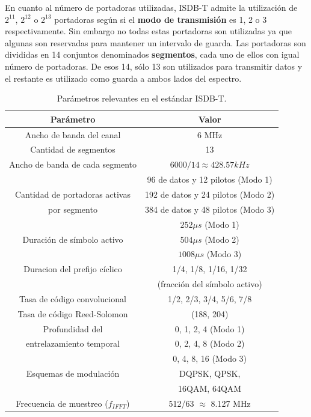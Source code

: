 \documentclass[journal,comsoc]{IEEEtran}
\begin{document}
En cuanto al número de portadoras utilizadas, ISDB-T admite la utilización de $2^{11}$, $2^{12}$ o $2^{13}$ portadoras según si el \textbf{modo de transmisión} es 1, 2 o 3 respectivamente. Sin embargo no todas estas portadoras son utilizadas ya que algunas son reservadas para mantener un intervalo de guarda. Las portadoras son divididas en 14 conjuntos denominados \textbf{segmentos}, cada uno de ellos con igual número de portadoras. De esos 14, sólo 13 son utilizados para transmitir datos y el restante es utilizado como guarda a ambos lados del espectro.
\begin{table}[h!]
\centering
\begin{tabular}{|c|c|}
\hline
\textbf{Parámetro} 				& \textbf{Valor}\\
\hline
Ancho de banda del canal 		& 6 MHz\\
\hline
Cantidad de segmentos 			& 13 \\
\hline
Ancho de banda de cada segmento & $6000/14 \approx 428.57kHz$ \\
\hline
  											& 96 de datos y 12 pilotos (Modo 1) \\
Cantidad de portadoras activas  & 192 de datos y 24 pilotos (Modo 2) \\
 		por segmento									& 384 de datos y 48 pilotos (Modo 3)\\
\hline
 								& $252 \mu s$ (Modo 1)\\
Duración de símbolo activo 		& $504 \mu s$ (Modo 2) \\
								& $1008 \mu s$ (Modo 3) \\
\hline
Duracion del prefijo cíclico 	& 1/4, 1/8, 1/16, 1/32 \\
 								& (fracción del símbolo activo)\\
\hline
Tasa de código convolucional 	& 1/2, 2/3, 3/4, 5/6, 7/8\\
\hline
Tasa de código Reed-Solomon 	& (188, 204) \\
\hline
 	Profundidad del			& 0, 1, 2, 4 (Modo 1) \\
entrelazamiento temporal & 0, 2, 4, 8 (Modo 2) \\
		 & 0, 4, 8, 16 (Modo 3)\\
\hline
Esquemas de modulación & DQPSK, QPSK,\\
 & 16QAM, 64QAM\\
 \hline
 Frecuencia de muestreo ($f_{IFFT}$) & 512/63 $\approx$ 8.127 MHz\\
 \hline
\end{tabular}
\caption{\label{parametros_ISDBT} Par\'ametros relevantes en el est\'andar ISDB-T.}
\end{table}
\end{document}
